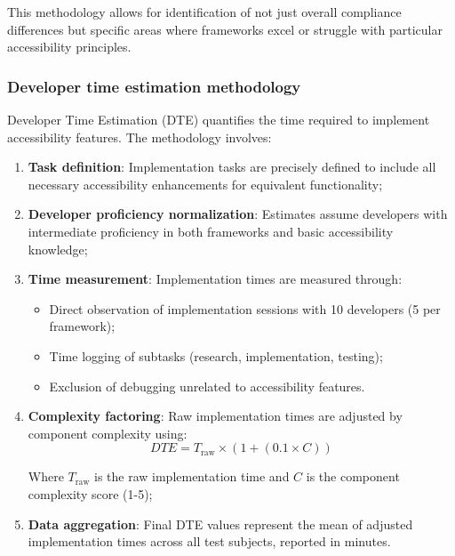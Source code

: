 This methodology allows for identification of not just overall compliance differences but specific areas where frameworks excel or struggle with particular accessibility principles.

\subsubsection{Developer time estimation methodology}
\label{subsubsec:dte-methodology}

Developer Time Estimation (DTE) quantifies the time required to implement accessibility features. The methodology involves:

\begin{enumerate}
    \item \textbf{Task definition}: Implementation tasks are precisely defined to include all necessary accessibility enhancements for equivalent functionality;
    
    \item \textbf{Developer proficiency normalization}: Estimates assume developers with intermediate proficiency in both frameworks and basic accessibility knowledge;
    
    \item \textbf{Time measurement}: Implementation times are measured through:
    \begin{itemize}
        \item Direct observation of implementation sessions with 10 developers (5 per framework);
        \item Time logging of subtasks (research, implementation, testing);
        \item Exclusion of debugging unrelated to accessibility features.
    \end{itemize}
    
    \item \textbf{Complexity factoring}: Raw implementation times are adjusted by component complexity using:
    \begin{equation}
    DTE = T_{\text{raw}} \times (1 + (0.1 \times C))
    \end{equation}
    
    Where $T_{\text{raw}}$ is the raw implementation time and $C$ is the component complexity score (1-5);
    
    \item \textbf{Data aggregation}: Final DTE values represent the mean of adjusted implementation times across all test subjects, reported in minutes.
\end{enumerate}

